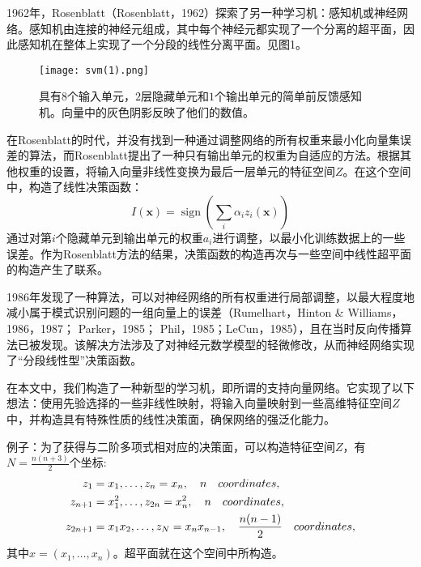 \documentclass[lang=cn,11pt,a4paper]{elegantpaper}
\begin{document}
	1962年，Rosenblatt（Rosenblatt，1962）探索了另一种学习机：感知机或神经网络。感知机由连接的神经元组成，其中每个神经元都实现了一个分离的超平面，因此感知机在整体上实现了一个分段的线性分离平面。见图1。
	\begin{figure}[htbp]
		\centering
		\texttt{[image: svm(1).png]}
		\caption{具有$8$个输入单元，$2$层隐藏单元和$1$个输出单元的简单前反馈感知机。向量中的灰色阴影反映了他们的数值。}
	\end{figure}
	在Rosenblatt的时代，并没有找到一种通过调整网络的所有权重来最小化向量集误差的算法，而Rosenblatt提出了一种只有输出单元的权重为自适应的方法。根据其他权重的设置，将输入向量非线性变换为最后一层单元的特征空间$Z$。在这个空间中，构造了线性决策函数：
	\begin{equation}
		I(\mathbf{x})=\operatorname{sign}\left(\sum_{i} \alpha_{i} z_{i}(\mathbf{x})\right)\tag{4}
	\end{equation}
	通过对第$i$个隐藏单元到输出单元的权重$a_i$进行调整，以最小化训练数据上的一些误差。作为Rosenblatt方法的结果，决策函数的构造再次与一些空间中线性超平面的构造产生了联系。

	1986年发现了一种算法，可以对神经网络的所有权重进行局部调整，以最大程度地减小属于模式识别问题的一组向量上的误差（Rumelhart，Hinton \& Williams，1986，1987； Parker，1985； Phil，1985；LeCun，1985），且在当时反向传播算法已被发现。该解决方法涉及了对神经元数学模型的轻微修改，从而神经网络实现了“分段线性型”决策函数。

	在本文中，我们构造了一种新型的学习机，即所谓的支持向量网络。它实现了以下想法：使用先验选择的一些非线性映射，将输入向量映射到一些高维特征空间$Z$中，并构造具有特殊性质的线性决策面，确保网络的强泛化能力。

	例子：为了获得与二阶多项式相对应的决策面，可以构造特征空间$Z$，有$N=\frac{n(n+3)}{2}$个坐标:
	\begin{align}
		z_{1}&=x_{1},\ldots,z_{n}=x_{n},\quad n \quad coordinates, \notag \\ 
		z_{n+1}&=x_{1}^{2},\ldots,z_{2n}=x_{n}^{2},\quad n\quad coordinates, \notag \\
		z_{2n+1}&=x_{1} x_{2},\ldots,z_{N}=x_{n} x_{n-1},\quad \frac{n(n-1)}{2} \quad coordinates,\notag
	\end{align}
	其中$x=(x_1,\ldots,x_n)$。超平面就在这个空间中所构造。
\end{document}
